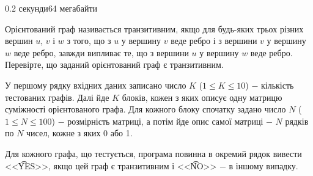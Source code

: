 \begin{problem}{}{}{}{0.2 секунди}{64 мегабайти}

Орієнтований граф називається транзитивним, якщо для будь-яких трьох різних вершин $u$, $v$ і $w$ з того,
що з $u$ у вершину $v$ веде ребро і з вершини $v$ у вершину $w$ веде ребро, завжди випливає те, що з вершини $u$ у вершину $w$ веде ребро.
Перевірте, що заданий орієнтований граф є транзитивним.

\InputFile
У першому рядку вхідних даних записано число $K$ ($1 \le K \le 10$) $-$ кількість тестованих графів.
Далі йде $K$ блоків, кожен з яких описує одну матрицю суміжності орієнтованого графа.
Для кожного блоку спочатку задано число $N$ ($1 \le N \le 100$) $-$ розмірність матриці, а потім йде опис самої матриці $-$ $N$ рядків по $N$ чисел, кожне з яких 0 або 1.

\OutputFile
Для кожного графа, що тестується, програма повинна в окремий рядок вивести <<{\t{YES}}>>, якщо цей граф є транзитивним і <<{\t{NO}}>> $-$ в іншому випадку.

\Example

\begin{example}
\end{example}

\end{problem}
